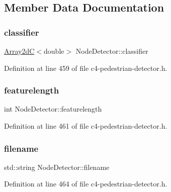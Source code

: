 \subsection{Member Data Documentation}
\mbox{\label{class_node_detector_a5eb3c12d3aa5250116334d6b4897ae47}} 
\subsubsection{\texorpdfstring{classifier}{classifier}}
{\footnotesize\ttfamily \mbox{\hyperlink{class_array2d_c}{Array2dC}}$<$double$>$ Node\+Detector\+::classifier}



Definition at line 459 of file c4-\/pedestrian-\/detector.\+h.

\mbox{\label{class_node_detector_a3ebce10718457e7875c01dbe1eb77fa9}} 
\subsubsection{\texorpdfstring{featurelength}{featurelength}}
{\footnotesize\ttfamily int Node\+Detector\+::featurelength}



Definition at line 461 of file c4-\/pedestrian-\/detector.\+h.

\mbox{\label{class_node_detector_ab4412f3aad986ffcc56289f95934ace1}} 
\subsubsection{\texorpdfstring{filename}{filename}}
{\footnotesize\ttfamily std\+::string Node\+Detector\+::filename}



Definition at line 464 of file c4-\/pedestrian-\/detector.\+h.

\mbox{\label{class_node_detector_a6a5fa5a89be5d2fd96b983f6afdab214}} 
